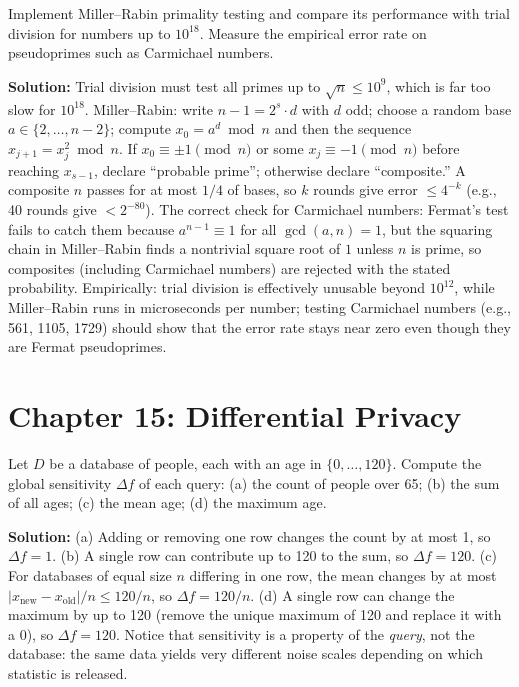 \begin{exercise}[Computational]
Implement Miller--Rabin primality testing and compare its performance with trial division for numbers up to $10^{18}$. Measure the empirical error rate on pseudoprimes such as Carmichael numbers.
\end{exercise}
\textbf{Solution:} Trial division must test all primes up to $\sqrt{n} \le 10^9$, which is far too slow for $10^{18}$. Miller--Rabin: write $n - 1 = 2^s \cdot d$ with $d$ odd; choose a random base $a \in \{2, \ldots, n-2\}$; compute $x_0 = a^d \bmod n$ and then the sequence $x_{j+1} = x_j^2 \bmod n$. If $x_0 \equiv \pm 1 \pmod n$ or some $x_j \equiv -1 \pmod n$ before reaching $x_{s-1}$, declare ``probable prime''; otherwise declare ``composite.'' A composite $n$ passes for at most $1/4$ of bases, so $k$ rounds give error $\le 4^{-k}$ (e.g., 40 rounds give $< 2^{-80}$). The correct check for Carmichael numbers: Fermat's test fails to catch them because $a^{n-1} \equiv 1$ for all $\gcd(a,n)=1$, but the squaring chain in Miller--Rabin finds a nontrivial square root of $1$ unless $n$ is prime, so composites (including Carmichael numbers) are rejected with the stated probability. Empirically: trial division is effectively unusable beyond $10^{12}$, while Miller--Rabin runs in microseconds per number; testing Carmichael numbers (e.g., 561, 1105, 1729) should show that the error rate stays near zero even though they are Fermat pseudoprimes.

\section{Chapter 15: Differential Privacy}

\begin{exercise}[Basic]
Let $D$ be a database of people, each with an age in $\{0, \ldots, 120\}$. Compute the global sensitivity $\Delta f$ of each query: (a) the count of people over 65; (b) the sum of all ages; (c) the mean age; (d) the maximum age.
\end{exercise}
\textbf{Solution:} (a) Adding or removing one row changes the count by at most 1, so $\Delta f = 1$. (b) A single row can contribute up to 120 to the sum, so $\Delta f = 120$. (c) For databases of equal size $n$ differing in one row, the mean changes by at most $|x_{\mathrm{new}} - x_{\mathrm{old}}|/n \le 120/n$, so $\Delta f = 120/n$. (d) A single row can change the maximum by up to 120 (remove the unique maximum of 120 and replace it with a 0), so $\Delta f = 120$. Notice that sensitivity is a property of the \emph{query}, not the database: the same data yields very different noise scales depending on which statistic is released.

